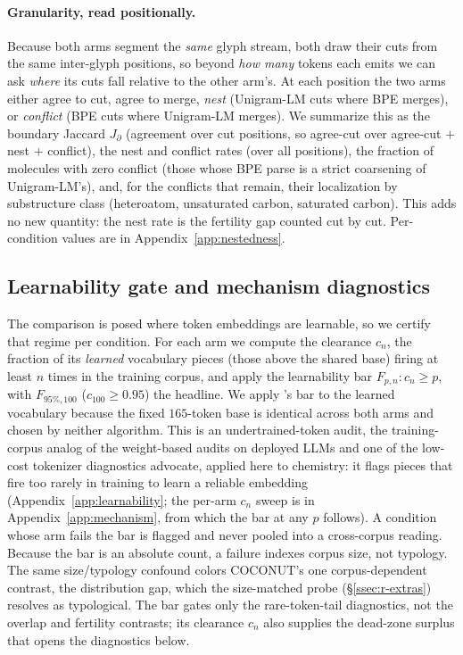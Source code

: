 \documentclass{article}
\begin{document}
\paragraph{Granularity, read positionally.}
Because both arms segment the \emph{same} glyph stream, both draw their cuts
from the same inter-glyph positions, so beyond \emph{how many} tokens
each emits we can ask \emph{where} its cuts fall relative to the other arm's. At
each position the two arms either agree to cut, agree to merge, \emph{nest}
(Unigram-LM cuts where BPE merges), or \emph{conflict} (BPE cuts where
Unigram-LM merges). We summarize this as the boundary Jaccard $J_{\partial}$
(agreement over cut positions, so agree-cut over agree-cut $+$ nest $+$
conflict), the nest and conflict rates (over all positions), the fraction of
molecules with zero conflict (those whose BPE parse is a strict coarsening of
Unigram-LM's), and, for the conflicts that remain, their localization by
substructure class (heteroatom, unsaturated carbon, saturated carbon). This adds
no new quantity: the nest rate is the fertility gap counted cut by cut.
Per-condition values are in
Appendix~\ref{app:nestedness}.

\subsection{Learnability gate and mechanism diagnostics}\label{ssec:vregime}

The comparison is posed where token embeddings are learnable, so we certify
that regime per condition. For each arm we compute the clearance $c_n$, the
fraction of its \emph{learned} vocabulary pieces (those above the shared base) firing
at least $n$ times in the training corpus, and apply the learnability bar
$F_{p,n}\!: c_n \ge p$, with $F_{95\%,100}$ ($c_{100} \ge 0.95$) the headline. We
apply \citet{gowda2020optimal-vocab-nmt}'s bar to the learned vocabulary because
the fixed $165$-token base is identical across both arms and chosen by neither
algorithm. This
is an undertrained-token audit, the training-corpus analog of the
weight-based audits on deployed LLMs \citep{land2024fishing} and one of the
low-cost tokenizer diagnostics \citet{alqahtani2026stop} advocate, applied here
to chemistry: it flags pieces that fire too rarely in training to learn a
reliable embedding (Appendix~\ref{app:learnability}; the per-arm $c_n$ sweep is
in Appendix~\ref{app:mechanism}, from which the bar at any $p$ follows). A
condition whose arm fails the bar is flagged and never pooled into a
cross-corpus reading. Because the bar is an absolute count, a failure indexes
corpus size, not typology. The same size/typology confound colors COCONUT's one
corpus-dependent contrast, the distribution gap, which the size-matched probe
(\S\ref{ssec:r-extras}) resolves as typological. The bar gates only the rare-token-tail diagnostics, not
the overlap and fertility contrasts; its clearance $c_n$ also supplies the
dead-zone surplus that opens the diagnostics below.
\end{document}
